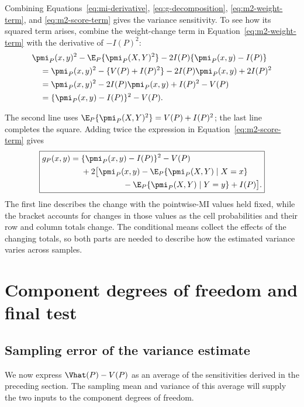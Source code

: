 Combining Equations~\eqref{eq:mi-derivative},
\eqref{eq:g-decomposition}, \eqref{eq:m2-weight-term}, and
\eqref{eq:m2-score-term} gives the variance sensitivity. To see how its
squared term arises, combine the weight-change term in
Equation~\eqref{eq:m2-weight-term} with the derivative of \(-I(P)^2\):
\begin{align*}
 &\pmi_P(x,y)^2-\E_P\{\pmi_P(X,Y)^2\}
       -2I(P)\{\pmi_P(x,y)-I(P)\}\\*
 &\quad=\pmi_P(x,y)^2-\{V(P)+I(P)^2\}
       -2I(P)\pmi_P(x,y)+2I(P)^2\\*
 &\quad=\pmi_P(x,y)^2-2I(P)\pmi_P(x,y)+I(P)^2-V(P)\\*
 &\quad=\{\pmi_P(x,y)-I(P)\}^2-V(P).
\end{align*}
\begin{samepage}%
The second line uses
\(\E_P\{\pmi_P(X,Y)^2\}=V(P)+I(P)^2\); the last line completes the
square. Adding twice the expression in Equation~\eqref{eq:m2-score-term}
gives
\begin{equation}
\boxed{
\begin{aligned}
g_P(x,y)
={}&\{\pmi_P(x,y)-I(P)\}^2-V(P)\\
&+2\bigl[
\pmi_P(x,y)
-\E_P\{\pmi_P(X,Y)\mid X=x\}\\
&\hspace{18mm}
-\E_P\{\pmi_P(X,Y)\mid Y=y\}
+I(P)
\bigr].
\end{aligned}
}
\label{eq:g-final}
\end{equation}
The first line describes the change with the pointwise-MI values held
fixed, while the bracket accounts for changes in those values as the cell
probabilities and their row and column totals change. The conditional
means collect the effects of the changing totals, so both parts are needed
to describe how the estimated variance varies across samples.
\par
\end{samepage}

\section{Component degrees of freedom and final test}
\label{sec:component-df}

\subsection{Sampling error of the variance estimate}

We now express \(\Vhat(P)-V(P)\) as an average of the sensitivities
derived in the preceding section. The sampling mean and variance of
this average will supply the two inputs to the component degrees of
freedom.

